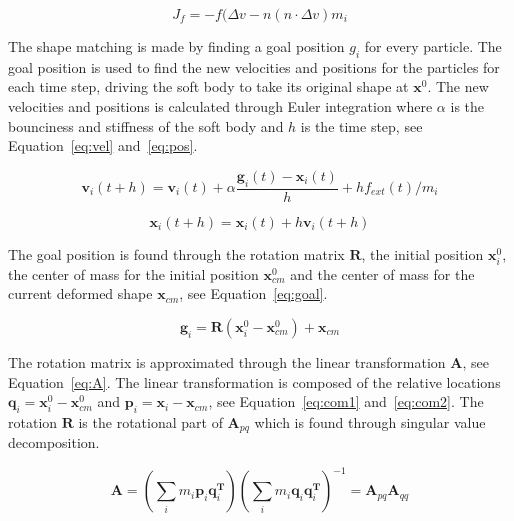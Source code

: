     \begin{equation} \label{eq:fric}
        J_f = -f(\Delta{v} - n(n\cdot{\Delta{v}})m_i
    \end{equation}

    The shape matching is made by finding a goal position $g_i$ for every particle.
    The goal position is used to find the new velocities and positions for the particles for each time step, driving the soft body to take its original shape at $\mathbf{x}^0$.
    The new velocities and positions is calculated through Euler integration where $\alpha$ is the bounciness and stiffness of the soft body and $h$ is the time step, see Equation~\ref{eq:vel} and~\ref{eq:pos}.

    \begin{equation} \label{eq:vel}
        \mathbf{v}_i(t + h) = \mathbf{v}_i(t) + \alpha{\frac{\mathbf{g}_i(t) - \mathbf{x}_i(t)}{h}} + hf_{ext}(t)/m_i
    \end{equation}

    \begin{equation} \label{eq:pos}
        \mathbf{x}_i(t + h) = \mathbf{x}_i(t) + h\mathbf{v}_i(t + h) 
    \end{equation}

    The goal position is found through the rotation matrix $\mathbf{R}$, the initial position $\mathbf{x}^0_i$, the center of mass for the initial position $\mathbf{x}^0_{cm}$ and the center of mass for the current deformed shape $\mathbf{x}_{cm}$, see Equation~\ref{eq:goal}.
   
    \begin{equation}\label{eq:goal}
        \mathbf{g}_i = \mathbf{R}(\mathbf{x}^0_i - \mathbf{x}^0_{cm}) + \mathbf{x}_{cm}
    \end{equation}

    The rotation matrix is approximated through the linear transformation $\mathbf{A}$, see Equation~\ref{eq:A}.
    The linear transformation is composed of the relative locations $\mathbf{q}_i = \mathbf{x}^0_i - \mathbf{x}^0_{cm}$ and $\mathbf{p}_i = \mathbf{x}_i - \mathbf{x}_{cm}$, see Equation~\ref{eq:com1} and~\ref{eq:com2}.
    The rotation $\mathbf{R}$ is the rotational part of $\mathbf{A}_{pq}$ which is found through singular value decomposition.

    \begin{equation} \label{eq:A}
        \mathbf{A} = (\sum_i{m_i\mathbf{p}_i\mathbf{q}_i^{\mathbf{T}}})
        (\sum_i{m_i\mathbf{q}_i\mathbf{q}_i^{\mathbf{T}}})^{-1} 
        = \mathbf{A}_{pq}\mathbf{A}_{qq}
    \end{equation}

